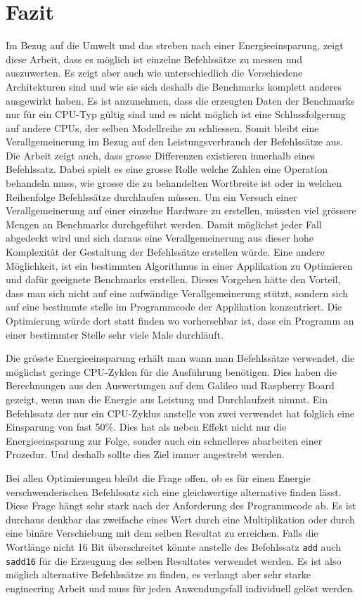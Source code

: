 \chapter{Fazit}

Im Bezug auf die Umwelt und das streben nach einer Energieeinsparung, zeigt diese Arbeit, dass es möglich ist einzelne Befehlssätze zu messen und auszuwerten. Es zeigt aber auch wie unterschiedlich die Verschiedene Architekturen sind und wie sie sich deshalb die Benchmarks komplett anderes ausgewirkt haben. Es ist anzunehmen, dass die erzeugten Daten der Benchmarks nur für ein CPU-Typ gültig sind und es nicht möglich ist eine Schlussfolgerung auf andere CPUs, der selben Modellreihe zu schliessen. Somit bleibt eine Verallgemeinerung im Bezug auf den Leistungsverbrauch der Befehlssätze aus. Die Arbeit zeigt auch, dass grosse Differenzen existieren innerhalb eines Befehlssatz. Dabei spielt es eine grosse Rolle welche Zahlen eine Operation behandeln muss, wie grosse die zu behandelten Wortbreite ist oder in welchen Reihenfolge Befehlssätze durchlaufen müssen. Um ein Versuch einer Verallgemeinerung auf einer einzelne Hardware zu erstellen, müssten viel grössere Mengen an Benchmarks durchgeführt werden. Damit möglichst jeder Fall abgedeckt wird und sich daraus eine Verallgemeinerung aus dieser hohe Komplexität der Gestaltung der Befehlssätze erstellen würde. Eine andere Möglichkeit, ist ein bestimmten Algorithmus in einer Applikation zu Optimieren und dafür geeignete Benchmarks erstellen. Dieses Vorgehen hätte den Vorteil, dass man sich nicht auf eine aufwändige Verallgemeinerung stützt, sondern sich auf eine bestimmte stelle im Programmcode der Applikation konzentriert. Die Optimierung würde dort statt finden wo vorhersehbar ist, dass ein Programm an einer bestimmter Stelle sehr viele Male durchläuft.

\par
Die grösste Energieeinsparung erhält man wann man Befehlssätze verwendet, die möglichst geringe CPU-Zyklen für die Ausführung benötigen. Dies haben die Berechnungen aus den Auswertungen auf dem Galileo und Raspberry Board gezeigt, wenn man die Energie aus Leistung und Durchlaufzeit nimmt. Ein Befehlssatz der nur ein CPU-Zyklus anstelle von zwei verwendet hat folglich eine Einsparung von fast 50\%. Dies hat als neben Effekt nicht nur die Energieeinsparung zur Folge, sonder auch ein schnelleres abarbeiten einer Prozedur. Und deshalb sollte dies Ziel immer angestrebt werden.
\par
Bei allen Optimierungen bleibt die Frage offen, ob es für einen Energie verschwenderischen Befehlssatz sich eine gleichwertige alternative finden lässt. Diese Frage hängt sehr stark nach der Anforderung des Programmcode ab. Es ist durchaus denkbar das zweifache eines Wert durch eine Multiplikation oder durch eine binäre Verschiebung mit dem selben Resultat zu erreichen. Falls die Wortlänge nicht 16 Bit überschreitet könnte anstelle des Befehlssatz \texttt{add} auch \texttt{sadd16} für die Erzeugung des selben Resultates verwendet werden. Es ist also möglich alternative Befehlssätze zu finden, es verlangt aber sehr starke engineering Arbeit und muss für jeden Anwendungsfall individuell gelöst werden.


